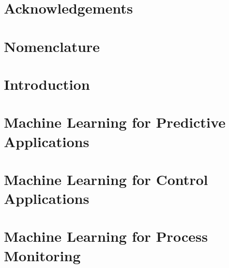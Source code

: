 \documentclass[12pt]{report}
\begin{document}
\tableofcontents
\listoffigures
\listoftables

\chapter*{Acknowledgements}

\chapter*{Nomenclature}

\chapter{Introduction}


\chapter{Machine Learning for Predictive Applications}


\chapter{Machine Learning for Control Applications}


\chapter{Machine Learning for Process Monitoring}


% 

% 

% 
\end{document}
